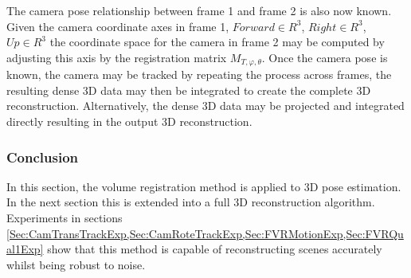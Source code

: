 The camera pose relationship between frame 1 and frame 2 is also now known. Given the camera coordinate axes in frame 1, $Forward \in R^3$, $Right \in R^3$, $Up \in R^3$ the coordinate space for the camera in frame 2 may be computed by adjusting this axis by the registration matrix $M_{T,\varphi,\theta}$. Once the camera pose is known, the camera may be tracked by repeating the process across frames, the resulting dense 3D data may then be integrated to create the complete 3D reconstruction. Alternatively, the dense 3D data may be projected and integrated directly resulting in the output 3D reconstruction. \\

\subsubsection{Conclusion}

In this section, the volume registration method is applied to 3D pose estimation. In the next section this is extended into a full 3D reconstruction algorithm. Experiments in sections \ref{Sec:CamTransTrackExp,Sec:CamRoteTrackExp,Sec:FVRMotionExp,Sec:FVRQual1Exp}
show that this method is capable of reconstructing scenes accurately whilst being robust to noise. 
